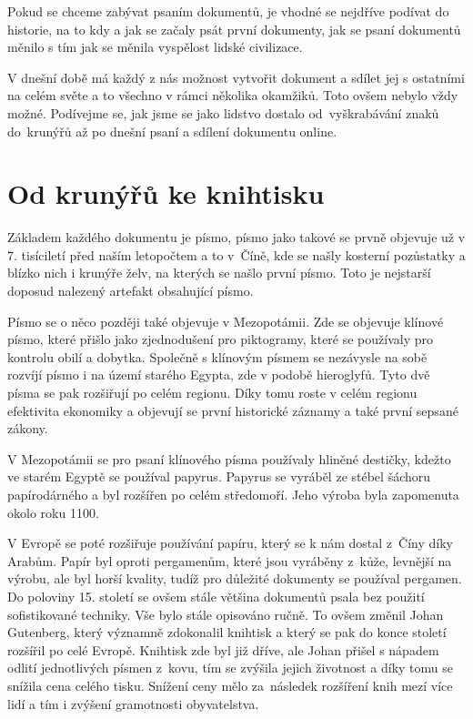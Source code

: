 Pokud se chceme zabývat psaním dokumentů, je vhodné se nejdříve podívat do historie, na to kdy a jak se začaly psát první dokumenty, jak se psaní dokumentů
měnilo s tím jak se měnila vyspělost lidské civilizace.

V dnešní době má každý z nás možnost vytvořit dokument a sdílet jej s ostatními na celém světe a to všechno v rámci několika okamžiků. Toto ovšem nebylo
vždy možné. Podívejme se, jak jsme se jako lidstvo dostalo od~vyškrabávání znaků do~krunýřů až po dnešní psaní a sdílení dokumentu online.

\section{Od krunýřů ke knihtisku}

Základem každého dokumentu je písmo, písmo jako takové se prvně objevuje už v 7. tisíciletí před naším letopočtem a to v~Číně,
kde se našly kosterní pozůstatky a blízko nich i krunýře želv, na kterých se našlo první písmo. \cite{EarliestWriting} Toto je nejstarší doposud
nalezený artefakt obsahující písmo.

Písmo se o něco později také objevuje v Mezopotámii. Zde se objevuje klínové písmo, které přišlo jako zjednodušení pro piktogramy, které se použí\-valy
pro kontrolu obilí a dobytka. Společně s klínovým písmem se nezávysle na sobě rozvíjí písmo i na území starého Egypta, zde v podobě hieroglyfů. Tyto dvě
písma se pak rozšiřují po celém regionu. Díky tomu roste v celém regionu efektivita ekonomiky a objevují se první historické záznamy
\cite{MesopotamiaHistory} a také první sepsané zákony.

V Mezopotámii se pro psaní klínového písma používaly hliněné destičky, kdežto ve starém Egyptě se používal papyrus. Papyrus se vyráběl ze stébel šáchoru
papírodárného a byl rozšířen po celém středomoří. Jeho výroba byla zapomenuta okolo roku 1100.

V Evropě se poté rozšiřuje používání papíru, který se k nám dostal z~Číny díky Arabům. Papír byl oproti pergamenům, které jsou vyráběny z~kůže, levnější
na výrobu, ale byl horší kvality, tudíž pro důležité dokumenty se používal pergamen. Do poloviny 15. století se ovšem stále většina dokumentů psala bez
použití sofistikované techniky. Vše bylo stále opisováno ručně. To ovšem změnil Johan Gutenberg, který významně zdokonalil knihtisk a který se pak do
konce století rozšířil po celé Evropě. Knihtisk zde byl již dříve, ale Johan přišel s nápadem odlití jednotlivých písmen z~kovu, tím se zvýšila
jejich životnost a díky tomu se snížila cena celého tisku. Snížení ceny mělo za~následek rozšíření knih mezí více lidí a tím i zvýšení gramotnosti
obyvatelstva. \cite{ucebnice1}

